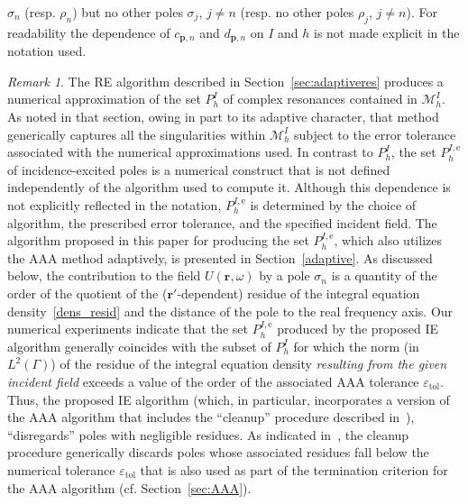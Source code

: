 \documentclass[11pt]{article}
\theoremstyle{plain}
\theoremstyle{remark}
\newtheorem{remark}{Remark}
\def \br{\mathbf{r}}
\def \bp{\mathbf{p}}
\begin{document}
$\sigma_n$ (resp.  $\rho_n$) but no other poles $\sigma_j$, $j\ne n$
(resp. no other poles $\rho_j$, $j\ne n$). For readability the
dependence of $c_{\bp,n}$ and $d_{\bp,n}$ on $I$ and $h$ is not made
explicit in the notation used.
\begin{remark}\label{rmk:phIe_is_numer}
  The RE algorithm described in Section~\ref{sec:adaptiveres} produces
  a numerical approximation of the set $P^I_h$ of complex resonances
  contained in $\mathcal{M}^I_h$. As noted in that section, owing in
  part to its adaptive character, that method generically captures all
  the singularities within $\mathcal{M}^I_h$ subject to the error
  tolerance associated with the numerical approximations used.  In
  contrast to $P^I_h$, the set $P_{h}^{I,\mathrm{e}}$ of
  incidence-excited poles is a numerical construct that is not defined
  independently of the algorithm used to compute it. Although this
  dependence is not explicitly reflected in the notation,
  $P_{h}^{I,\mathrm{e}}$ is determined by the choice of algorithm, the
  prescribed error tolerance, and the specified incident field. The
  algorithm proposed in this paper for producing the set
  $P_{h}^{I,\mathrm{e}}$, which also utilizes the AAA method
  adaptively, is presented in Section~\ref{adaptive}. As discussed
  below, the contribution to the field $U(\br,\omega)$ by a pole
  $\sigma_n$ is a quantity of the order of the quotient of the
  ($\mathbf{r}'$-dependent) residue of the integral equation
  density~\eqref{dens_resid} and the distance of the pole to the real
  frequency axis. Our numerical experiments indicate that the set
  $P_{h}^{I,\mathrm{e}}$ produced by the proposed IE algorithm
  generally coincides with the subset of $P^I_h$ for which the norm
  (in $L^2(\Gamma)$) of the residue of the integral equation density
  \emph{resulting from the given incident field} exceeds a value of
  the order of the associated AAA tolerance
  $\varepsilon_\mathrm{tol}$.  Thus, the proposed IE algorithm (which,
  in particular, incorporates a version of the AAA algorithm that
  includes the ``cleanup'' procedure described in~\cite[Sec. 5]{AAA}),
  ``disregards'' poles with negligible residues. As indicated
  in~\cite{AAA}, the cleanup procedure generically discards poles
  whose associated residues fall below the numerical tolerance
  $\varepsilon_\mathrm{tol}$ that is also used as part of the
  termination criterion for the AAA algorithm
  (cf. Section~\ref{sec:AAA}).
  \end{remark}
\end{document}
